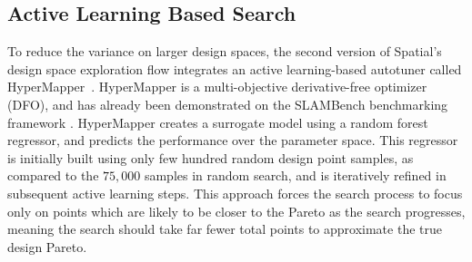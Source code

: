 \subsection{Active Learning Based Search}
To reduce the variance on larger design spaces, the second version of
Spatial's design space exploration flow integrates an active learning-based autotuner called HyperMapper~\cite{Bodin2016:PACT16,NardiBSVDK17,Saeedi_ICRA_2017}.
HyperMapper is a multi-objective derivative-free optimizer (DFO), and has already been demonstrated on the SLAMBench benchmarking framework \cite{nardi2015introducing}.
HyperMapper creates a surrogate model using a random forest regressor,
and predicts the performance over the parameter space.
This regressor is initially built using only few hundred random design point
samples, as compared to the $75,000$ samples in random search,
and is iteratively refined in subsequent active learning steps. This approach
forces the search process to focus only on points which are likely to be closer to the
Pareto as the search progresses, meaning the search should take far fewer total
points to approximate the true design Pareto.
